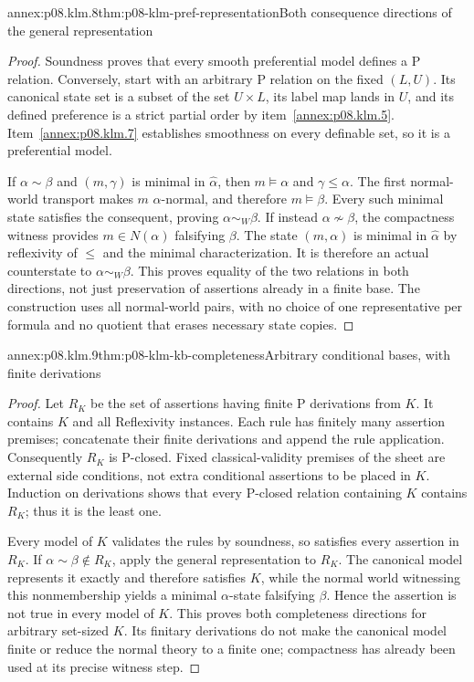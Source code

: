 \begin{annexitem}{annex:p08.klm.8}{thm:p08-klm-pref-representation}{Both consequence directions of the general representation}
\begin{proof}
Soundness proves that every smooth preferential model defines a P
relation. Conversely, start with an arbitrary P relation on the fixed
\((L,U)\). Its canonical state set is a subset of the set \(U\times L\),
its label map lands in \(U\), and its defined preference is a strict
partial order by item~\ref{annex:p08.klm.5}. Item~\ref{annex:p08.klm.7}
establishes smoothness on every definable set, so it is a preferential model.

If \(\alpha\sim\beta\) and \((m,\gamma)\) is minimal in
\(\widehat\alpha\), then \(m\models\alpha\) and
\(\gamma\leq\alpha\). The first normal-world transport makes
\(m\) \(\alpha\)-normal, and therefore \(m\models\beta\).
Every such minimal state satisfies the consequent, proving
\(\alpha\sim_W\beta\).
If instead \(\alpha\not\sim\beta\), the compactness witness
provides \(m\in N(\alpha)\) falsifying \(\beta\).
The state \((m,\alpha)\) is minimal in \(\widehat\alpha\) by
reflexivity of \(\leq\) and the minimal characterization. It is
therefore an actual counterstate to \(\alpha\sim_W\beta\).
This proves equality of the two relations in both directions, not just
preservation of assertions already in a finite base. The construction
uses all normal-world pairs, with no choice of one representative per
formula and no quotient that erases necessary state copies.
\end{proof}
\end{annexitem}

\begin{annexitem}{annex:p08.klm.9}{thm:p08-klm-kb-completeness}{Arbitrary conditional bases, with finite derivations}
\begin{proof}
Let \(R_K\) be the set of assertions having finite P derivations from
\(K\). It contains \(K\) and all Reflexivity instances. Each rule
has finitely many assertion premises; concatenate their finite
derivations and append the rule application. Consequently \(R_K\)
is P-closed. Fixed classical-validity premises of the sheet are external
side conditions, not extra conditional assertions to be placed in \(K\).
Induction on derivations shows that every P-closed relation containing
\(K\) contains \(R_K\); thus it is the least one.

Every model of \(K\) validates the rules by soundness, so satisfies
every assertion in \(R_K\). If \(\alpha\sim\beta\notin R_K\),
apply the general representation to \(R_K\). The canonical model
represents it exactly and therefore satisfies \(K\), while the normal
world witnessing this nonmembership yields a minimal
\(\alpha\)-state falsifying \(\beta\). Hence the assertion is
not true in every model of \(K\). This proves both completeness
directions for arbitrary set-sized \(K\). Its finitary derivations do
not make the canonical model finite or reduce the normal theory to a
finite one; compactness has already been used at its precise witness step.
\end{proof}
\end{annexitem}

